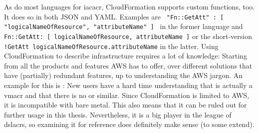 \newline
As do most languages for \gls{iacacr}, CloudFormation supports custom functions, too. It does so in both JSON and YAML. Examples are
\newline %
\texttt{{ "Fn::GetAtt" : [ "logicalNameOfResource", "attributeName" ] }} in the former language and \texttt{Fn::GetAtt: [ logicalNameOfResource, attributeName ]} or the short-version
\newline %
\texttt{!GetAtt logicalNameOfResource.attributeName} in the latter.
\newline
Using CloudFormation to describe infrastructure requires a lot of knowledge: Starting from all the products and features AWS has to offer, over different solutions that have (partially) redundant features, up to understanding the AWS jargon. An example for this is : New users have a hard time understanding that  is actually a \gls{vmacr} and that there is no  or similar.
\newline
Since CloudFormation is limited to AWS, it is incompatible with bare metal. This also means that it can be ruled out for further usage in this thesis. Nevertheless, it is a big player in the league of \gls{dslacr}s, so examining it for reference does definitely make sense (to some extend).

